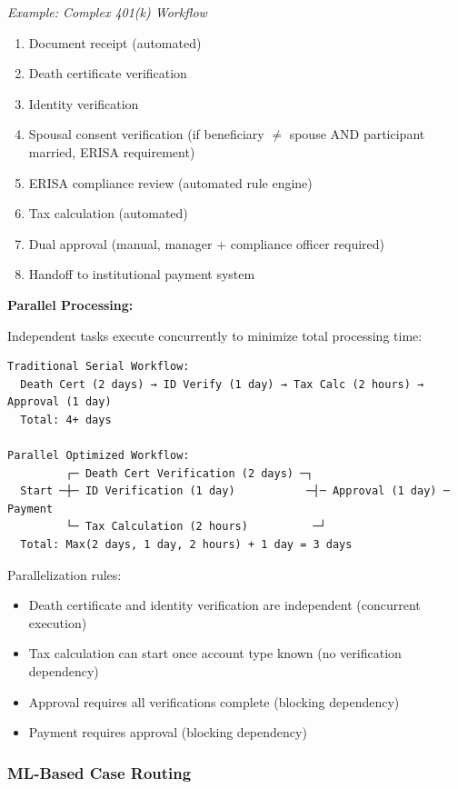 \textit{Example: Complex 401(k) Workflow}
\begin{enumerate}
\item Document receipt (automated)
\item Death certificate verification
\item Identity verification
\item Spousal consent verification (if beneficiary $\neq$ spouse AND participant married, ERISA requirement)
\item ERISA compliance review (automated rule engine)
\item Tax calculation (automated)
\item Dual approval (manual, manager + compliance officer required)
\item Handoff to institutional payment system
\end{enumerate}

\textbf{Parallel Processing:}

Independent tasks execute concurrently to minimize total processing time:

\begin{verbatim}
Traditional Serial Workflow:
  Death Cert (2 days) → ID Verify (1 day) → Tax Calc (2 hours) → Approval (1 day)
  Total: 4+ days

Parallel Optimized Workflow:
         ┌─ Death Cert Verification (2 days) ─┐
  Start ─┼─ ID Verification (1 day)           ─┤─ Approval (1 day) ─ Payment
         └─ Tax Calculation (2 hours)          ─┘
  Total: Max(2 days, 1 day, 2 hours) + 1 day = 3 days
\end{verbatim}

Parallelization rules:
\begin{itemize}
\item Death certificate and identity verification are independent (concurrent execution)
\item Tax calculation can start once account type known (no verification dependency)
\item Approval requires all verifications complete (blocking dependency)
\item Payment requires approval (blocking dependency)
\end{itemize}

\subsubsection{ML-Based Case Routing}

